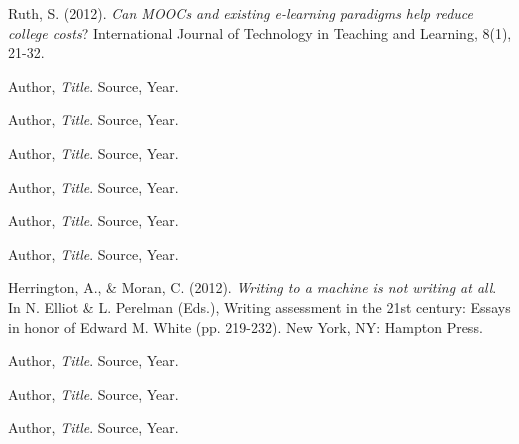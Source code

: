 \documentclass[12pt, Arial]{article}
\begin{document}
\begin{thebibliography}{9}

  Ruth, S. (2012). \emph{Can MOOCs and existing e-learning paradigms help reduce college costs}? International Journal of Technology in Teaching and Learning, 8(1), 21-32.

  Author,
  \emph{Title}.
  Source,
  Year.

  Author,
  \emph{Title}.
  Source,
  Year.

  Author,
  \emph{Title}.
  Source,
  Year.

  Author,
  \emph{Title}.
  Source,
  Year.

  Author,
  \emph{Title}.
  Source,
  Year.

  Author,
  \emph{Title}.
  Source,
  Year.

  Herrington, A., \& Moran, C. (2012). \emph{Writing to a machine is not writing at all}. In N. Elliot \& L. Perelman (Eds.), Writing assessment in the 21st century: Essays in honor of Edward M. White (pp. 219-232). New York, NY: Hampton Press.

  Author,
  \emph{Title}.
  Source,
  Year.
  
Author,
  \emph{Title}.
  Source,
  Year.
  
Author,
  \emph{Title}.
  Source,
  Year.
  
\end{thebibliography}
\end{document}
